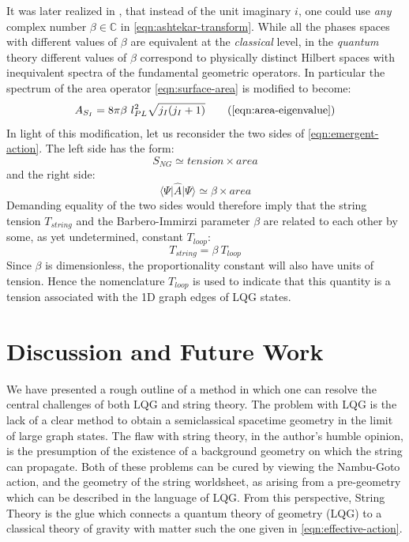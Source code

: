 \documentclass[submission, Phys]{SciPost}
\newcommand{\mbb}[1]{\mathbb{#1}}
\newcommand{\expect}[1]{\langle #1\rangle}
\begin{document}
It was later realized in \cite{Barbero1996From,Immirzi1996Real}, that instead of the unit imaginary $ i $, one could use \emph{any} complex number $ \beta \in \mbb{C}$ in \eqref{eqn:ashtekar-transform}. While all the phases spaces with different values of $ \beta $ are equivalent at the \emph{classical} level, in the \emph{quantum} theory different values of $ \beta $ correspond to physically distinct Hilbert spaces with inequivalent spectra of the fundamental geometric operators. In particular the spectrum of the area operator \eqref{eqn:surface-area} is modified to become:
\begin{equation}\label{eqn:surface-area-immirizi}
	A_{S_I} = 8\pi \beta ~ l^2_{PL} \sqrt{j_I (j_I + 1)} \tag{\ref{eqn:area-eigenvalue}}
\end{equation}
In light of this modification, let us reconsider the two sides of \eqref{eqn:emergent-action}. The left side has the form:
\begin{equation*}
	S_{NG} \simeq tension \times area
\end{equation*}
and the right side:
\begin{equation*}
	\expect{\Psi\vert \hat A \vert \Psi} \simeq \beta \times area
\end{equation*}
Demanding equality of the two sides would therefore imply that the string tension $ T_{string} $ and the Barbero-Immirzi parameter $ \beta $ are related to each other by some, as yet undetermined, constant $ T_{loop} $:
\begin{equation}\label{key}
	T_{string} = \beta ~ T_{loop}
\end{equation}
Since $ \beta $ is dimensionless, the proportionality constant will also have units of tension. Hence the nomenclature $ T_{loop} $ is used to indicate that this quantity is a tension associated with the 1D graph edges of LQG states.

\section{Discussion and Future Work}\label{sec:discussion}

We have presented a rough outline of a method in which one can resolve the central challenges of both LQG and string theory. The problem with LQG is the lack of a clear method to obtain a semiclassical spacetime geometry in the limit of large graph states. The flaw with string theory, in the author's humble opinion, is the presumption of the existence of a background geometry on which the string can propagate. Both of these problems can be cured by viewing the Nambu-Goto action, and the geometry of the string worldsheet, as arising from a pre-geometry which can be described in the language of LQG. From this perspective, String Theory is the glue which connects a quantum theory of geometry (LQG) to a classical theory of gravity with matter such the one given in \eqref{eqn:effective-action}.
\end{document}
